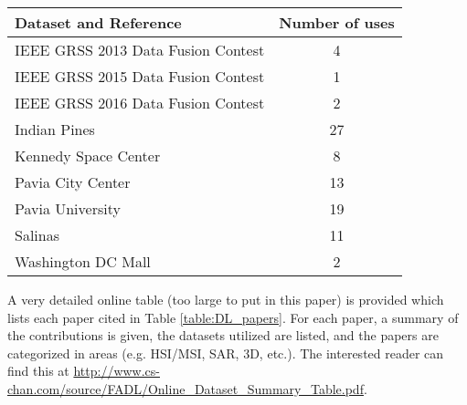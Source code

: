 \documentclass[12pt]{spieman}
\begin{document}
\begin{spacing}{1}
\begin{table}[ht]
\begin{center}
\begin{tabular}{|l|c|}
\hline
\rule[-1ex]{0pt}{3.5ex}  \textbf{Dataset and Reference}         &  \textbf{Number of uses} \\
\hline
\hline

IEEE GRSS 2013 Data Fusion Contest \cite{IEEEGRSSDataFusion2013Dataset}     & 4   \\
\hline

IEEE GRSS 2015 Data Fusion Contest \cite{IEEEGRSSDataFusion2015Dataset}     & 1   \\
\hline

IEEE GRSS 2016 Data Fusion Contest \cite{IEEEGRSSDataFusion2016Dataset}     & 2   \\
\hline

Indian Pines \cite{IndianPinesDataset}	                                    & 27  \\
\hline

Kennedy Space Center \cite{KennedySpaceCenterDataSet}                       & 8   \\
\hline

Pavia City Center \cite{PaviaDatasets}                                      & 13  \\
\hline

Pavia University \cite{PaviaDatasets}                                       & 19  \\ 
\hline

Salinas \cite{SalinasDataset}                                               & 11  \\
\hline

Washington DC Mall \cite{WashingtonDCMallDataset}                            & 2   \\
\hline

\end{tabular}
\end{center}
\end{table}

A very detailed online table (too large to put in this paper) is provided which lists each paper cited in Table \ref{table:DL_papers}. For each paper, a summary of the contributions is given, the datasets utilized are listed, and the papers are categorized in areas (e.g. HSI/MSI, SAR, 3D, etc.). The interested reader can find this at \url{http://www.cs-chan.com/source/FADL/Online_Dataset_Summary_Table.pdf}.


\end{spacing}
\end{document}
